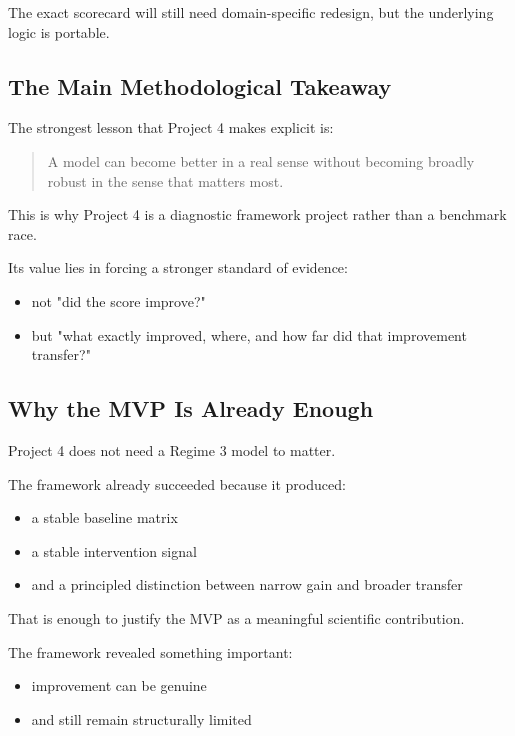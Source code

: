 \documentclass[11pt]{article}
\begin{document}
The exact scorecard will still need domain-specific redesign, but the underlying logic is portable.

\subsection{The Main Methodological Takeaway}

The strongest lesson that Project 4 makes explicit is:

\begin{quote}
A model can become better in a real sense without becoming broadly robust in the sense that matters most.
\end{quote}

This is why Project 4 is a diagnostic framework project rather than a benchmark race.

Its value lies in forcing a stronger standard of evidence:
\begin{itemize}[leftmargin=1.5em]
    \item not "did the score improve?"
    \item but "what exactly improved, where, and how far did that improvement transfer?"
\end{itemize}

\subsection{Why the MVP Is Already Enough}

Project 4 does not need a Regime 3 model to matter.

The framework already succeeded because it produced:
\begin{itemize}[leftmargin=1.5em]
    \item a stable baseline matrix
    \item a stable intervention signal
    \item and a principled distinction between narrow gain and broader transfer
\end{itemize}

That is enough to justify the MVP as a meaningful scientific contribution.

The framework revealed something important:
\begin{itemize}[leftmargin=1.5em]
    \item improvement can be genuine
    \item and still remain structurally limited
\end{itemize}
\end{document}
